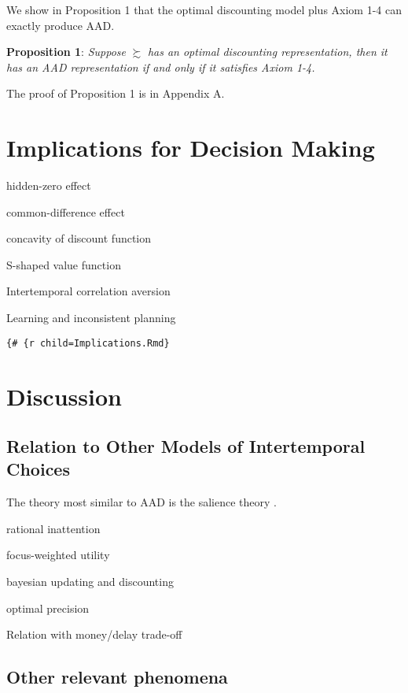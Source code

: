 \documentclass[
  12pt,
]{article}
\begin{document}
We show in Proposition 1 that the optimal discounting model plus Axiom
1-4 can exactly produce AAD.

\noindent \textbf{Proposition 1}: \emph{Suppose} \(\succsim\) \emph{has
an optimal discounting representation, then it has an AAD representation
if and only if it satisfies Axiom 1-4.}

The proof of Proposition 1 is in Appendix A.

\hypertarget{implications-for-decision-making}{%
\section{Implications for Decision
Making}\label{implications-for-decision-making}}

hidden-zero effect

common-difference effect

concavity of discount function

S-shaped value function

Intertemporal correlation aversion

Learning and inconsistent planning

\texttt{\{\#\ \{r\ child=\textquotesingle{}Implications.Rmd\textquotesingle{}\}}

\hypertarget{discussion}{%
\section{Discussion}\label{discussion}}

\hypertarget{relation-to-other-models-of-intertemporal-choices}{%
\subsection{Relation to Other Models of Intertemporal
Choices}\label{relation-to-other-models-of-intertemporal-choices}}

The theory most similar to AAD is the salience theory
\citep{bordalo2012salience, bordalo2013salience, bordalo2020memory}.

rational inattention

focus-weighted utility

bayesian updating and discounting

optimal precision

Relation with money/delay trade-off

\hypertarget{other-relevant-phenomena}{%
\subsection{Other relevant phenomena}\label{other-relevant-phenomena}}
\end{document}
